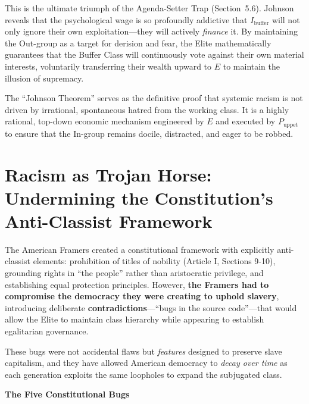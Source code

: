 \documentclass[12pt,openany]{book}
\begin{document}
\noindent This is the ultimate triumph of the Agenda-Setter Trap (Section~5.6). Johnson reveals that the psychological wage is so profoundly addictive that $I_{\text{buffer}}$ will not only ignore their own exploitation---they will actively \textit{finance} it. By maintaining the Out-group as a target for derision and fear, the Elite mathematically guarantees that the Buffer Class will continuously vote against their own material interests, voluntarily transferring their wealth upward to $E$ to maintain the illusion of supremacy.

\medskip
The ``Johnson Theorem'' serves as the definitive proof that systemic racism is not driven by irrational, spontaneous hatred from the working class. It is a highly rational, top-down economic mechanism engineered by $E$ and executed by $P_{\text{uppet}}$ to ensure that the In-group remains docile, distracted, and eager to be robbed.
\section{Racism as Trojan Horse: Undermining the Constitution's Anti-Classist Framework}

The American Framers created a constitutional framework with explicitly anti-classist elements: prohibition of titles of nobility (Article I, Sections 9-10), grounding rights in ``the people'' rather than aristocratic privilege, and establishing equal protection principles. However, \textbf{the Framers had to compromise the democracy they were creating to uphold slavery}, introducing deliberate \textbf{contradictions}---``bugs in the source code''---that would allow the Elite to maintain class hierarchy while appearing to establish egalitarian governance.

These bugs were not accidental flaws but \textit{features} designed to preserve slave capitalism, and they have allowed American democracy to \textit{decay over time} as each generation exploits the same loopholes to expand the subjugated class.

\textbf{The Five Constitutional Bugs}
\end{document}
